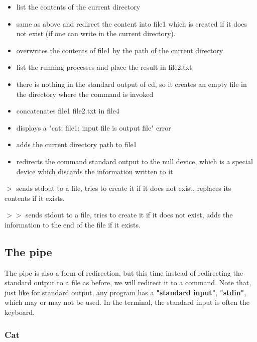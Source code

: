 \documentclass[11pt]{article}
\begin{document}
\begin{solution}
 \begin{itemize}
 	\item list the contents of the current directory
 	\item same as above and redirect the content into file1 which is created if it does not exist (if one can write in the current directory).
 	\item overwrites the contents of file1 by the path of the current directory
 	\item list the running processes and place the result in file2.txt
 	\item there is nothing in the standard output of cd, so it creates an empty file in the directory where the command is invoked
 	\item concatenates file1 file2.txt in file4
 	\item displays a "cat: file1: input file is output file" error
 	\item adds the current directory path to file1
 	\item redirects the command standard output to the null device, which is a special device which discards the information written to it
 
 \end{itemize}

$> $ sends stdout to a file, tries to create it if it does not exist, replaces its contents if it exists.

$ >> $ sends stdout to a file, tries to create it if it does not exist, adds the information to the end of the file if it exists.

\end{solution}

\subsection{The pipe}

The pipe is also a form of redirection, but this time instead of redirecting the standard output to a file as before, we will redirect it to a command. Note that, just like for standard output, any program has a \textbf{"standard input"}, \textbf{"stdin"}, which may or may not be used. In the terminal, the standard input is often the keyboard.

\subsubsection{Cat}
\end{document}
